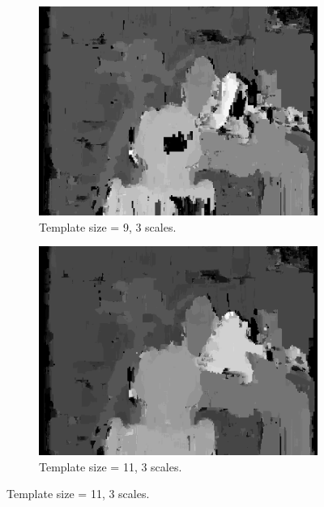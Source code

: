 \documentclass[12pt,a4paper,oneside,final]{article}
\begin{document}
\begin{figure}[H]
\begin{subfigure}[b]{0.24\textwidth}
	\includegraphics[width=\textwidth]{disparity_s3_k9set_1.png}
	\caption{Template size = 9, 3 scales.}
\end{subfigure}
\begin{subfigure}[b]{0.24\textwidth}
	\includegraphics[width=\textwidth]{disparity_s3_k11set_1.png}
	\caption{Template size = 11, 3 scales.}
\end{subfigure}
\end{figure}
\end{document}
